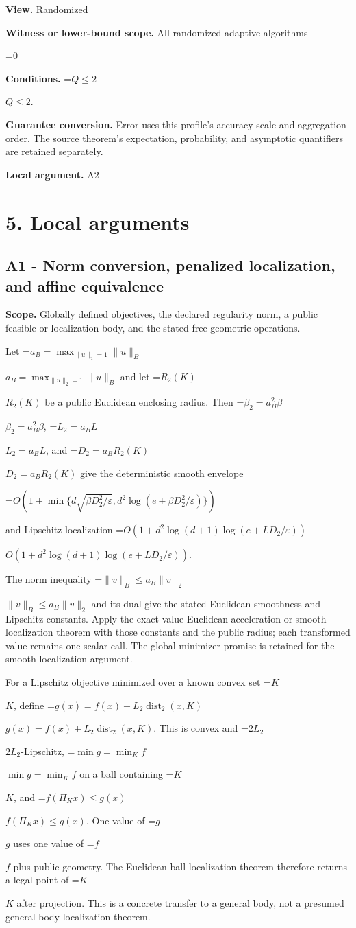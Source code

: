 \documentclass[10pt,a4paper]{article}
\newcommand{\AtlasMath}[1]{\par\begingroup\centering\setbox0=\hbox{$\displaystyle #1$}\ifdim\wd0>1.4\linewidth\typeout{ATLAS WIDE FORMULA: \the\wd0}\fi\ifdim\wd0>\linewidth\resizebox{\linewidth}{!}{\box0}\else\box0\fi\par\endgroup}
\newcommand{\AtlasInlineMath}[1]{\begingroup\setbox0=\hbox{$#1$}\ifdim\wd0>.4\linewidth\endgroup\AtlasMath{#1}\else\endgroup$#1$\fi}
\begin{document}
\textbf{View.} Randomized

\textbf{Witness or lower-bound scope.} All randomized adaptive algorithms

\AtlasMath{0}
\textbf{Conditions.} \AtlasInlineMath{Q\le2}.

\textbf{Guarantee conversion.} Error uses this profile's accuracy scale and aggregation order. The source theorem's expectation, probability, and asymptotic quantifiers are retained separately.

\textbf{Local argument.} A2

\section{5. Local arguments}
\subsection{A1 - Norm conversion, penalized localization, and affine equivalence}
\textbf{Scope.} Globally defined objectives, the declared regularity norm, a public feasible or localization body, and the stated free geometric operations.

Let \AtlasInlineMath{a_B=\max_{\|u\|_2=1}\|u\|_B} and let \AtlasInlineMath{R_2(K)} be a public Euclidean enclosing radius. Then \AtlasInlineMath{\beta_2=a_B^2\beta}, \AtlasInlineMath{L_2=a_BL}, and \AtlasInlineMath{D_2=a_BR_2(K)} give the deterministic smooth envelope

\AtlasMath{O\!\left(1+\min\{d\sqrt{\beta D_2^2/\varepsilon},d^2\log(e+\beta D_2^2/\varepsilon)\}\right)}

and Lipschitz localization \AtlasInlineMath{O(1+d^2\log(d+1)\log(e+LD_2/\varepsilon))}.

The norm inequality \AtlasInlineMath{\|v\|_B\le a_B\|v\|_2} and its dual give the stated Euclidean smoothness and Lipschitz constants. Apply the exact-value Euclidean acceleration or smooth localization theorem with those constants and the public radius; each transformed value remains one scalar call. The global-minimizer promise is retained for the smooth localization argument.

For a Lipschitz objective minimized over a known convex set \AtlasInlineMath{K}, define \AtlasInlineMath{g(x)=f(x)+L_2\operatorname{dist}_2(x,K)}. This is convex and \AtlasInlineMath{2L_2}-Lipschitz, \AtlasInlineMath{\min g=\min_K f} on a ball containing \AtlasInlineMath{K}, and \AtlasInlineMath{f(\Pi_Kx)\le g(x)}. One value of \AtlasInlineMath{g} uses one value of \AtlasInlineMath{f} plus public geometry. The Euclidean ball localization theorem therefore returns a legal point of \AtlasInlineMath{K} after projection. This is a concrete transfer to a general body, not a presumed general-body localization theorem.
\end{document}
